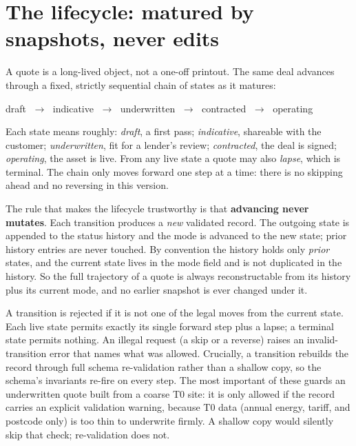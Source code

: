 \section{The lifecycle: matured by snapshots, never edits}

A quote is a long-lived object, not a one-off printout. The same deal advances through a fixed, strictly sequential chain of states as it matures:

\begin{center}\sffamily\small
draft $\;\rightarrow\;$ indicative $\;\rightarrow\;$ underwritten $\;\rightarrow\;$ contracted $\;\rightarrow\;$ operating
\end{center}

Each state means roughly: \emph{draft}, a first pass; \emph{indicative}, shareable with the customer; \emph{underwritten}, fit for a lender's review; \emph{contracted}, the deal is signed; \emph{operating}, the asset is live. From any live state a quote may also \emph{lapse}, which is terminal. The chain only moves forward one step at a time: there is no skipping ahead and no reversing in this version.

The rule that makes the lifecycle trustworthy is that \textbf{advancing never mutates}. Each transition produces a \emph{new} validated record. The outgoing state is appended to the status history and the mode is advanced to the new state; prior history entries are never touched. By convention the history holds only \emph{prior} states, and the current state lives in the mode field and is not duplicated in the history. So the full trajectory of a quote is always reconstructable from its history plus its current mode, and no earlier snapshot is ever changed under it.

A transition is rejected if it is not one of the legal moves from the current state. Each live state permits exactly its single forward step plus a lapse; a terminal state permits nothing. An illegal request (a skip or a reverse) raises an invalid-transition error that names what was allowed. Crucially, a transition rebuilds the record through full schema re-validation rather than a shallow copy, so the schema's invariants re-fire on every step. The most important of these guards an underwritten quote built from a coarse T0 site: it is only allowed if the record carries an explicit validation warning, because T0 data (annual energy, tariff, and postcode only) is too thin to underwrite firmly. A shallow copy would silently skip that check; re-validation does not.

